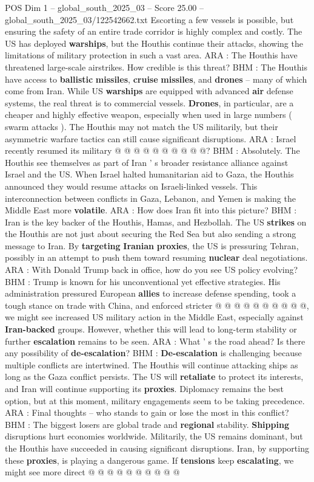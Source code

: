 \begin{textsample}{POS Dim 1 – global\_south\_2025\_03 – Score 25.00 – global\_south\_2025\_03/122542662.txt}
Escorting a few vessels is possible, but ensuring the safety of an entire trade corridor is highly complex and costly.
The US has deployed \textbf{warships}, but the Houthis continue their attacks, showing the limitations of military protection in such a vast area.
ARA : The Houthis have threatened large-scale airstrikes.
How credible is this threat?
BHM : The Houthis have access to \textbf{ballistic} \textbf{missiles}, \textbf{cruise} \textbf{missiles}, and \textbf{drones} -- many of which come from Iran.
While US \textbf{warships} are equipped with advanced \textbf{air} defense systems, the real threat is to commercial vessels. \textbf{Drones}, in particular, are a cheaper and highly effective weapon, especially when used in large numbers ( swarm attacks ).
The Houthis may not match the US militarily, but their asymmetric warfare tactics can still cause significant disruptions.
ARA : Israel recently resumed its military @ @ @ @ @ @ @ @ @ @?
BHM : Absolutely.
The Houthis see themselves as part of Iran ' s broader resistance alliance against Israel and the US.
When Israel halted humanitarian aid to Gaza, the Houthis announced they would resume attacks on Israeli-linked vessels.
This interconnection between conflicts in Gaza, Lebanon, and Yemen is making the Middle East more \textbf{volatile}.
ARA : How does Iran fit into this picture?
BHM : Iran is the key backer of the Houthis, Hamas, and Hezbollah.
The US \textbf{strikes} on the Houthis are not just about securing the Red Sea but also sending a strong message to Iran.
By \textbf{targeting} \textbf{Iranian} \textbf{proxies}, the US is pressuring Tehran, possibly in an attempt to push them toward resuming \textbf{nuclear} deal negotiations.
ARA : With Donald Trump back in office, how do you see US policy evolving?
BHM : Trump is known for his unconventional yet effective strategies.
His administration pressured European \textbf{allies} to increase defense spending, took a tough stance on trade with China, and enforced stricter @ @ @ @ @ @ @ @ @ @, we might see increased US military action in the Middle East, especially against \textbf{Iran-backed} groups.
However, whether this will lead to long-term stability or further \textbf{escalation} remains to be seen.
ARA : What ' s the road ahead?
Is there any possibility of \textbf{de-escalation}?
BHM : \textbf{De-escalation} is challenging because multiple conflicts are intertwined.
The Houthis will continue attacking ships as long as the Gaza conflict persists.
The US will \textbf{retaliate} to protect its interests, and Iran will continue supporting its \textbf{proxies}.
Diplomacy remains the best option, but at this moment, military engagements seem to be taking precedence.
ARA : Final thoughts -- who stands to gain or lose the most in this conflict?
BHM : The biggest losers are global trade and \textbf{regional} stability. \textbf{Shipping} disruptions hurt economies worldwide.
Militarily, the US remains dominant, but the Houthis have succeeded in causing significant disruptions.
Iran, by supporting these \textbf{proxies}, is playing a dangerous game.
If \textbf{tensions} keep \textbf{escalating}, we might see more direct @ @ @ @ @ @ @ @ @ @


\end{textsample}
